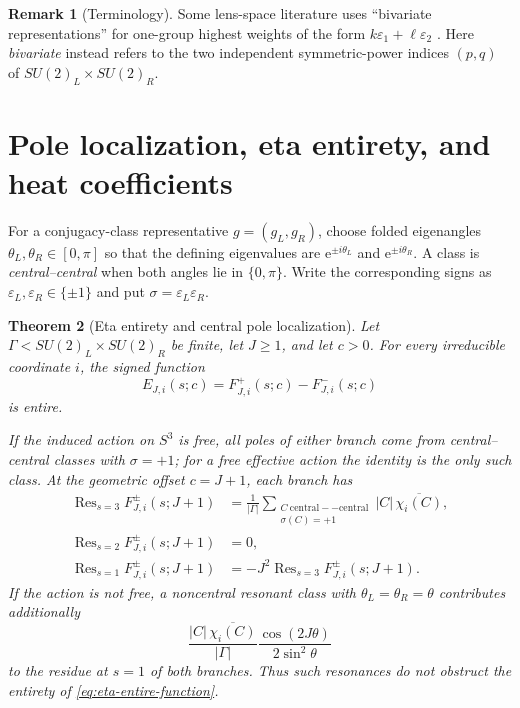 \documentclass[11pt]{article}
\newtheorem{theorem}{Theorem}[section]
\theoremstyle{definition}
\newtheorem{remark}[theorem]{Remark}
\DeclareMathOperator{\Res}{Res}
\newcommand{\e}{\mathrm e}
\begin{document}
\begin{remark}[Terminology]
Some lens-space literature uses ``bivariate representations'' for
one-group highest weights of the form
$k\varepsilon_1+\ell\varepsilon_2$
\cite{LauretRossiBertone2018,LauretMiatelloRossetti2021}.
Here \emph{bivariate} instead
refers to the two independent symmetric-power indices $(p,q)$ of
$SU(2)_L\times SU(2)_R$.
\end{remark}

\section{Pole localization, eta entirety, and heat coefficients}

For a conjugacy-class representative $g=(g_L,g_R)$, choose folded
eigenangles $\theta_L,\theta_R\in[0,\pi]$ so that the defining
eigenvalues are $\e^{\pm i\theta_L}$ and
$\e^{\pm i\theta_R}$.  A class is \emph{central--central} when both
angles lie in $\{0,\pi\}$.  Write the corresponding signs as
$\varepsilon_L,\varepsilon_R\in\{\pm1\}$ and put
$\sigma=\varepsilon_L\varepsilon_R$.

\begin{theorem}[Eta entirety and central pole localization]
\label{thm:eta-entire}
Let $\Gamma< SU(2)_L\times SU(2)_R$ be finite, let $J\geq1$, and let
$c>0$.  For every irreducible coordinate $i$, the signed function
\begin{equation}
 E_{J,i}(s;c)=F^+_{J,i}(s;c)-F^-_{J,i}(s;c)
 \label{eq:eta-entire-function}
\end{equation}
is entire.

If the induced action on $S^3$ is free, all poles of either branch
come from central--central classes with $\sigma=+1$; for a free effective
action the identity is the only such class.  At the geometric
offset $c=J+1$, each branch has
\begin{align}
 \Res_{s=3}F^{\pm}_{J,i}(s;J+1)
 &=\frac1{|\Gamma|}
   \sum_{\substack{C\ \mathrm{central--central}\\\sigma(C)=+1}}
   |C|\,\overline{\chi_i(C)},
 \label{eq:residue-three}\\
 \Res_{s=2}F^{\pm}_{J,i}(s;J+1)&=0,
 \label{eq:residue-two}\\
 \Res_{s=1}F^{\pm}_{J,i}(s;J+1)
 &=-J^2\Res_{s=3}F^{\pm}_{J,i}(s;J+1).
 \label{eq:residue-one}
\end{align}
If the action is not free, a noncentral resonant class with
$\theta_L=\theta_R=\theta$ contributes additionally
\begin{equation}
 \frac{|C|\,\overline{\chi_i(C)}}{|\Gamma|}
 \frac{\cos(2J\theta)}{2\sin^2\theta}
 \label{eq:resonant-residue}
\end{equation}
to the residue at $s=1$ of \emph{both} branches.  Thus such resonances
do not obstruct the entirety of \eqref{eq:eta-entire-function}.
\end{theorem}
\end{document}
